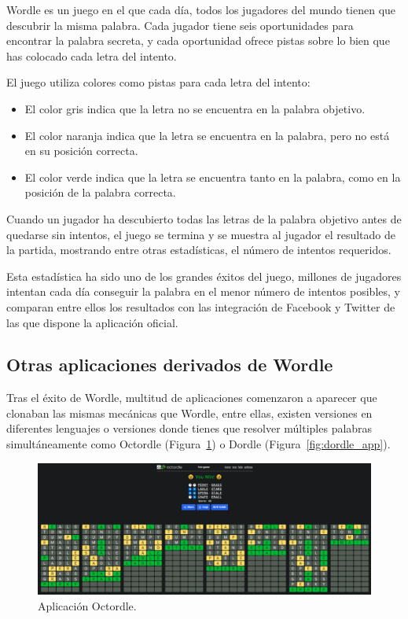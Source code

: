 Wordle es un juego en el que cada día, todos los jugadores del mundo tienen que descubrir la misma palabra.
Cada jugador tiene seis oportunidades para encontrar la palabra secreta, y cada oportunidad ofrece pistas sobre lo bien que has colocado cada letra del intento.

El juego utiliza colores como pistas para cada letra del intento:
\begin{itemize}
	\item El color gris indica que la letra no se encuentra en la palabra objetivo.
	\item El color naranja indica que la letra se encuentra en la palabra, pero no está en su posición correcta.
	\item El color verde indica que la letra se encuentra tanto en la palabra, como en la posición de la palabra correcta.
\end{itemize}

Cuando un jugador ha descubierto todas las letras de la palabra objetivo antes de quedarse sin intentos, el juego se termina y se muestra al jugador el resultado de la partida, mostrando entre otras estadísticas, el número de intentos requeridos.

Esta estadística ha sido uno de los grandes éxitos del juego, millones de jugadores intentan cada día conseguir la palabra en el menor número de intentos posibles, y comparan entre ellos los resultados con las integración de Facebook y Twitter de las que dispone la aplicación oficial.


\subsection{Otras aplicaciones derivados de Wordle}

Tras el éxito de Wordle, multitud de aplicaciones comenzaron a aparecer que clonaban las mismas mecánicas que Wordle, entre ellas, existen versiones en diferentes lenguajes o versiones donde tienes que resolver múltiples palabras simultáneamente como Octordle (Figura~\ref{fig:octordle_app}) o Dordle (Figura~\ref{fig:dordle_app}).


\begin{figure}
	\centering
	\includegraphics[clip=true,width=\textwidth]{images/octordle.png}
	\caption{Aplicación Octordle.}
	\label{fig:octordle_app}
\end{figure}

